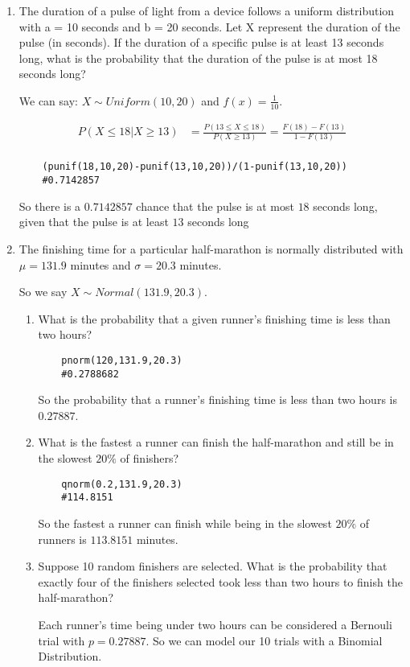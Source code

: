 \documentclass[]{article}
\begin{document}
\begin{enumerate}
\item The duration of a pulse of light from a device follows a uniform distribution with a = 10
seconds and b = 20 seconds. Let X represent the duration of the pulse (in seconds). If
the duration of a specific pulse is at least 13 seconds long, what is the probability that
the duration of the pulse is at most 18 seconds long?

We can say: $X\sim Uniform(10,20)$ and $f(x)=\frac{1}{10}$.

\begin{align*} 
    P(X\leq18|X\geq13)&=\frac{P(13\leq X\leq18)}{P(X\geq13)}=\frac{F(18)-F(13)}{1-F(13)}\\
\end{align*}
\begin{verbatim}
    (punif(18,10,20)-punif(13,10,20))/(1-punif(13,10,20))
    #0.7142857
\end{verbatim}
So there is a $0.7142857$ chance that the pulse is at most $18$ seconds long, given that the pulse is at least $13$ seconds long
\newpage
\item The finishing time for a particular half-marathon is normally distributed with $\mu = 131.9$
minutes and $\sigma = 20.3$ minutes.

So we say $X\sim Normal(131.9,20.3)$.
\begin{enumerate}[label= (\alph*)] 
\item What is the probability that a given runner's finishing time is less than two hours?
\begin{verbatim}
    pnorm(120,131.9,20.3)
    #0.2788682
\end{verbatim}
So the probability that a runner's finishing time is less than two hours is $0.27887$.
\item What is the fastest a runner can finish the half-marathon and still be in the slowest
$20\%$ of finishers?
\begin{verbatim}
    qnorm(0.2,131.9,20.3)
    #114.8151
\end{verbatim}
So the fastest a runner can finish while being in the slowest $20\%$ of runners is $113.8151$ minutes.
\item Suppose 10 random finishers are selected. What is the probability that exactly four
of the finishers selected took less than two hours to finish the half-marathon?

Each runner's time being under two hours can be considered a Bernouli trial with $p=0.27887$. So we can model our 10 trials with a Binomial Distribution.


\end{enumerate}
\end{enumerate}
\end{document}
